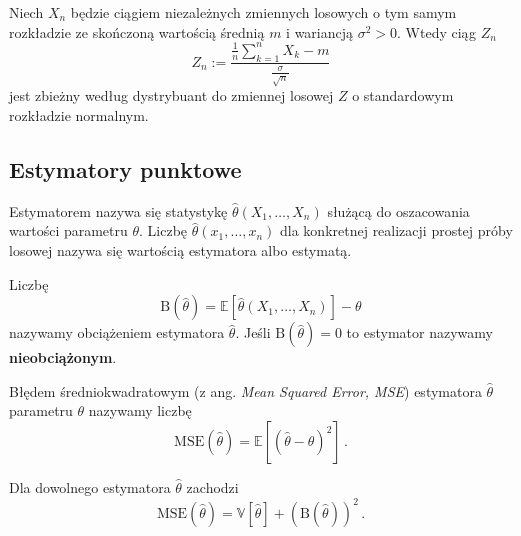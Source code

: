 \documentclass{myclass}
\numberwithin{equation}{section}
\begin{document}
\begin{theorem}
Niech \(X_n\) będzie ciągiem niezależnych zmiennych losowych o tym samym rozkładzie ze skończoną
wartością średnią \(m\) i wariancją \(\sigma^2 > 0\). Wtedy ciąg \(Z_n\)
\begin{equation*}
    Z_n := \frac{\frac{1}{n}\sum_{k=1}^n X_k - m}{\frac{\sigma}{\sqrt{n}}}
\end{equation*}
jest zbieżny według dystrybuant do zmiennej losowej \(Z\) o standardowym rozkładzie normalnym.
\end{theorem}


\subsection{Estymatory punktowe}

\begin{definition}[Estymatora]
Estymatorem nazywa się statystykę \(\hat{\theta}(X_1,\ldots,X_n)\) służącą do oszacowania wartości
parametru \(\theta\). Liczbę \(\hat{\theta}(x_1,\ldots,x_n)\) dla konkretnej realizacji prostej
próby losowej nazywa się wartością estymatora albo estymatą.
\end{definition}

\begin{definition}
Liczbę
\begin{equation*}
    \mathrm{B}(\hat{\theta}) = \mathbb{E}[\hat{\theta}(X_1,\ldots,X_n)] - \theta
\end{equation*}
nazywamy obciążeniem estymatora \(\hat\theta\). Jeśli \(\mathrm{B}(\hat{\theta}) = 0\) to estymator
nazywamy \textbf{nieobciążonym}.
\end{definition}

\begin{definition}
Błędem średniokwadratowym (z ang. \textit{Mean Squared Error, MSE}) estymatora \(\hat{\theta}\)
parametru \(\theta\) nazywamy liczbę
\begin{equation*}
    \mathrm{MSE}(\hat{\theta}) = \mathbb{E}[(\hat{\theta} - \theta)^2]\,.
\end{equation*}
\end{definition}

\begin{theorem}
Dla dowolnego estymatora \(\hat{\theta}\) zachodzi
\begin{equation*}
    \mathrm{MSE}(\hat{\theta}) = \mathbb{V}[\hat{\theta}] + (\mathrm{B}(\hat{\theta}))^2\,.
\end{equation*}
\end{theorem}
\end{document}
